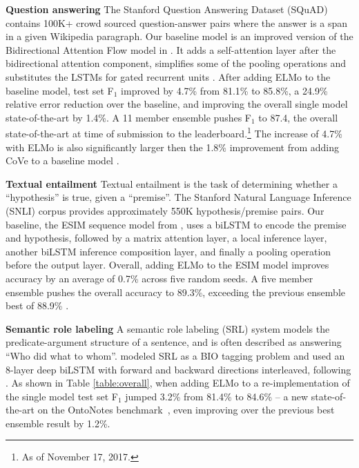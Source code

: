 \documentclass[11pt,a4paper]{article}
\newcommand{\ELMO}{ELMo}
\newcommand{\tinysection}[1]{\textbf{#1}}
\begin{document}
\tinysection{Question answering}
The Stanford Question Answering Dataset (SQuAD) \citep{Rajpurkar2016SQuAD10} contains 100K+ crowd sourced question-answer pairs where the answer is a span in a given Wikipedia paragraph.
Our baseline model \citep{ClarkAdvancingRC} is an improved version of the Bidirectional Attention Flow model in \citet[BiDAF; ][]{Seo2016BidirectionalAF}.  It adds a self-attention layer after the bidirectional attention component, simplifies some of the pooling operations and substitutes the LSTMs for gated recurrent units \citep[GRUs; ][]{GRU:Cho2014}.
After adding \ELMO{} to the baseline model, test set F$_1$ improved by 4.7\% from 81.1\% to 85.8\%, a 24.9\% relative error reduction over the baseline, and improving the overall single model state-of-the-art by 1.4\%.
A 11 member ensemble pushes F$_1$ to 87.4, the overall state-of-the-art at time of submission to the leaderboard.\footnote{As of November 17, 2017. 
}
The increase of 4.7\% with ELMo is also significantly larger then the 1.8\% improvement from adding CoVe to a baseline model \citep{McCann2017LearnedIT}.

\tinysection{Textual entailment}
Textual entailment is the task of determining whether a ``hypothesis'' is true, given a ``premise''.
The Stanford Natural Language Inference (SNLI) corpus \citep{snliemnlp2015} provides approximately 550K hypothesis/premise pairs. 
Our baseline, the ESIM sequence model
from \citet{Chen2017EnhancedLF}, uses a biLSTM to encode the premise and hypothesis, followed by a matrix attention layer, a local inference layer, another biLSTM inference composition layer, and finally a pooling operation before the output layer.
Overall, adding \ELMO{} to the ESIM model improves accuracy by an average of 0.7\% across five random seeds. 
A five member ensemble pushes the overall accuracy to 89.3\%, exceeding the previous ensemble best of 88.9\% \citep{Gong2017NaturalLI}.

\tinysection{Semantic role labeling}
A semantic role labeling (SRL) system models the predicate-argument structure of a sentence, and is often described as answering
``Who did what to whom''.
\citet{He2017DeepSR} modeled SRL as a BIO tagging problem and used an 8-layer deep biLSTM with forward and backward directions interleaved, following \citet{Zhou2015EndtoendLO}.
As shown in Table \ref{table:overall}, when adding \ELMO{} to a re-implementation of \citet{He2017DeepSR} the single model test set
F$_1$ jumped 3.2\% from 81.4\% to 84.6\% -- a new state-of-the-art on the OntoNotes benchmark~\citep{Pradhan2013TowardsRL}, even improving over the previous best ensemble result by 1.2\%. 
\end{document}
